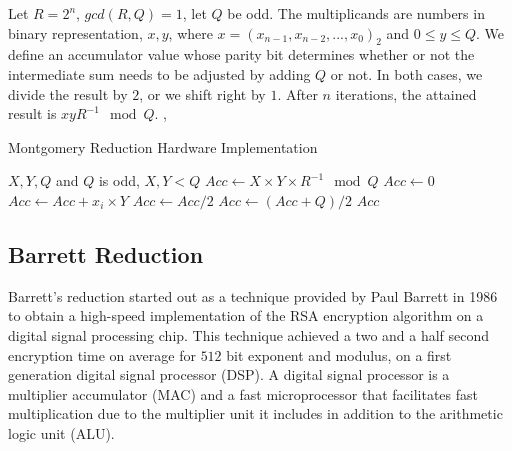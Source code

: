\documentclass[11pt,
  titlepage=false,
  abstract=on,
]{scrreprt}
\begin{document}
Let $R=2^n$, $gcd(R, Q)=1$, let $Q$ be odd. The multiplicands are numbers in binary representation, $x, y$, where $x = (x_{n-1}, x_{n-2},...,x_{0})_2$ and $0 \leq y \leq Q$. 
We define an accumulator value whose parity bit determines whether or not the intermediate sum needs to be adjusted by adding $Q$ or not. In both cases, we divide the result by
$2$, or we shift right by $1$. After $n$ iterations, the attained result is $xyR^{-1} \mod Q$. \cite{montgomery1985modular}, \cite{7219961}

\begin{algorithm}
  \caption{Montgomery Reduction Hardware Implementation}
  \label{alg:montgomery}
  \begin{algorithmic}[1]
  \REQUIRE \( X, Y, Q \) and \( Q \) is odd, \( X, Y < Q \)
  \renewcommand{\algorithmicensure}{\textbf{Output:}}
  \ENSURE \( Acc \leftarrow X \times Y \times R^{-1} \mod Q \)
  \STATE \( Acc \leftarrow 0 \)
      \STATE \( Acc \leftarrow Acc + x_i \times Y \)
          \STATE \( Acc \leftarrow Acc / 2 \)
      \ELSE
          \STATE \( Acc \leftarrow (Acc + Q) / 2 \)
      \ENDIF
  \ENDFOR
  \RETURN \( Acc \)
  \end{algorithmic}
\end{algorithm}



\newpage
\subsection{Barrett Reduction}
Barrett's reduction \cite{barrett1986implementing} started out as a technique provided by Paul Barrett in 1986 to obtain a high-speed implementation of the RSA encryption algorithm
on a digital signal processing chip. This technique achieved a two and a half second encryption time on average for $512$ bit exponent and modulus, on a first generation digital signal processor (DSP).
A digital signal processor is a multiplier accumulator (MAC) and a fast microprocessor that facilitates fast multiplication due to the multiplier unit it includes in addition to the arithmetic logic unit (ALU).
\end{document}
